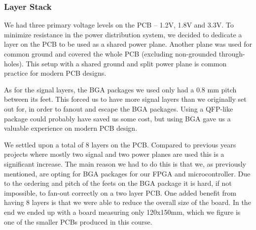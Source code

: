 \subsubsection{Layer Stack}

We had three primary voltage levels on the PCB -- 1.2V, 1.8V and 3.3V. To
minimize resistance in the power distribution system, we decided to dedicate a
layer on the PCB to be used as a shared power plane. Another plane was used for
common ground and covered the whole PCB (excluding non-grounded through-holes).
This setup with a shared ground and split power plane is common practice for
modern PCB designs.

As for the signal layers, the BGA packages we used only had a 0.8 mm pitch between
its feet. This forced us to have more signal layers than we originally set out
for, in order to fanout and escape the BGA packages. Using a QFP-like package
could probably have saved us some cost, but using BGA gave us a valuable
experience on modern PCB design.

We settled upon a total of 8 layers on the PCB. Compared to previous years projects
where mostly two signal and two power planes are used this is a significant increase.
The main reason we had to do this is that we, as previously mentioned, are opting for
BGA packages for our FPGA and microcontroller. Due to the ordering and pitch of the
feets on the BGA package it is hard, if not impossible, to fan-out correctly on a
two layer PCB. One added benefit from having 8 layers is that we were able to reduce
the overall size of the board. In the end we ended up with a board measuring only
120x150mm, which we figure is one of the smaller PCBs produced in this course.
